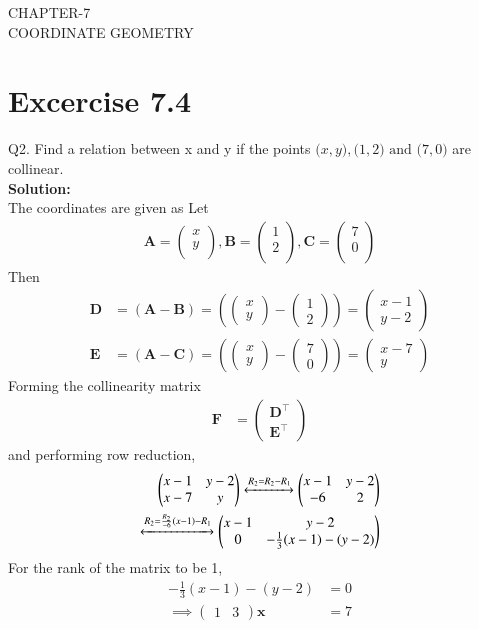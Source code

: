 \documentclass[12pt]{article}
\providecommand{\brak}[1]{\ensuremath{\left(#1\right)}}
\newcommand{\solution}{\noindent \textbf{Solution: }}
\newcommand{\myvec}[1]{\ensuremath{\begin{pmatrix}#1\end{pmatrix}}}
\let\vec\mathbf
\begin{document}
\begin{center}
\textbf\large{CHAPTER-7 \\ COORDINATE GEOMETRY}
\end{center}
\section*{Excercise 7.4}

Q2. Find a relation between x and y if the points $\vec(x, y), \vec(1, 2) \text{ and } \vec(7, 0)$ are collinear.
\\
\solution
\\
The coordinates are given as
\fi
Let
	\begin{align}
	\vec{A} = \myvec{
		x\\
		y\\
		},
	\vec{B} = \myvec{
		1\\
		2\\
		},
	\vec{C} = \myvec{
		7\\
		0\\
		}
	\end{align}
	Then
	\begin{align}
\vec{D} &=\brak{\vec{A}-\vec{B}} = \brak{\myvec{x \\y } - \myvec{1 \\2 } } = \myvec{x-1 \\ y-2 }\\
\vec{E} &= \brak{\vec{A}-\vec{C}} = \brak{\myvec{x \\ y } - \myvec{7 \\0} } = \myvec{x-7 \\y}
\end{align}
Forming the collinearity matrix
\begin{align}
	\vec{F} &={\myvec{\vec{D}^{\top}\\ \vec{E}^{\top}}}
\end{align}
and performing row reduction,
\begin{align}
\label{eq:chapters/10/7/4/2chem_balance_mat_row}
\myvec{
x-1 & y-2
\\
x-7 & y
}
\xleftrightarrow[]{R_2 = R_2-R_1}
\myvec{
  x-1 & y-2
  \\
	  -6 & 2                 
	  }
	  \\
	\xleftrightarrow[]{R_2 = \frac{R_2}{-6}(x-1)-R_1}
\myvec{
x-1 & y-2
\\
	0 & -\frac{1}{3}(x-1)-(y-2)
}
\end{align}
For the rank of the matrix to be 1,
\begin{align}
	-\frac{1}{3}(x-1)-(y-2)&=0\\
	\implies \myvec{1 & 3}\vec{x} &=7	
\end{align}
\end{document}
